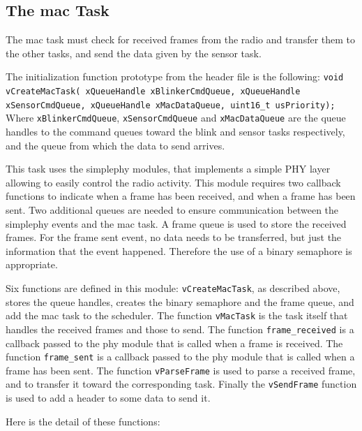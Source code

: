 \documentclass[11pt]{report}
\begin{document}
\subsection{The mac Task}

The mac task must check for received frames from the radio and transfer them to the other tasks, and send the data given by the sensor task.

The initialization function prototype from the header file is the following:
\verb$void vCreateMacTask( xQueueHandle xBlinkerCmdQueue, xQueueHandle xSensorCmdQueue, xQueueHandle xMacDataQueue, uint16_t usPriority);$
Where \verb$xBlinkerCmdQueue$, \verb$xSensorCmdQueue$ and \verb$xMacDataQueue$ are the queue handles to the command queues toward the blink and sensor tasks respectively, and the queue from which the data to send arrives.

This task uses the simplephy modules, that implements a simple PHY layer allowing to easily control the radio activity. This module requires two callback functions to indicate when a frame has been received, and when a frame has been sent. Two additional queues are needed to ensure communication between the simplephy events and the mac task. A frame queue is used to store the received frames. For the frame sent event, no data needs to be transferred, but just the information that the event happened. Therefore the use of a binary semaphore is appropriate.

Six functions are defined in this module: \verb$vCreateMacTask$, as described above, stores the queue handles, creates the binary semaphore and the frame queue, and add the mac task to the scheduler. The function \verb$vMacTask$ is the task itself that handles the received frames and those to send. The function \verb$frame_received$ is a callback passed to the phy module that is called when a frame is received. The function \verb$frame_sent$ is a callback passed to the phy module that is called when a frame has been sent. The function \verb$vParseFrame$ is used to parse a received frame, and to transfer it toward the corresponding task. Finally the  \verb$vSendFrame$ function is used to add a header to some data to send it.

Here is the detail of these functions:
\end{document}
